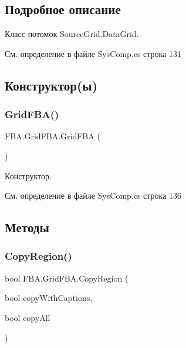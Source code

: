 \subsection{Подробное описание}
Класс потомок Source\+Grid.\+Data\+Grid. 



См. определение в файле Sys\+Comp.\+cs строка 131



\subsection{Конструктор(ы)}
\mbox{\label{class_f_b_a_1_1_grid_f_b_a_a04c3a780023d3791a39b0bc1fa37437f}} 
\subsubsection{\texorpdfstring{Grid\+F\+B\+A()}{GridFBA()}}
{\footnotesize\ttfamily F\+B\+A.\+Grid\+F\+B\+A.\+Grid\+F\+BA (\begin{DoxyParamCaption}{ }\end{DoxyParamCaption})}



Конструктор. 



См. определение в файле Sys\+Comp.\+cs строка 136



\subsection{Методы}
\mbox{\label{class_f_b_a_1_1_grid_f_b_a_aa1ff5c21ce47cf95da542f611070d40d}} 
\subsubsection{\texorpdfstring{Copy\+Region()}{CopyRegion()}}
{\footnotesize\ttfamily bool F\+B\+A.\+Grid\+F\+B\+A.\+Copy\+Region (\begin{DoxyParamCaption}\item[{bool}]{copy\+With\+Captions,  }\item[{bool}]{copy\+All }\end{DoxyParamCaption})}



